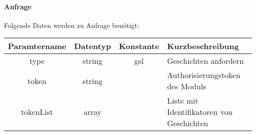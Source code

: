 \paragraph{Anfrage}Folgende Daten werden zu Anfrage benötigt:
\begin{table}[H]
	\begin{tabular}{|c|c|c|p{6.5cm}|}
		\hline
		\textbf{Paramtername} & \textbf{Datentyp} & \textbf{Konstante} & \textbf{Kurzbeschreibung}                                                                                               \\ \hline
		type                & string            & gsl                & Geschichten anfordern \\ \hline
		token               & string            &                    & Authorisierungstoken des Moduls \\ \hline
		tokenList           & array             &                    & Liste mit Identifikatoren von Geschichten \\ \hline
	\end{tabular}
\end{table}
